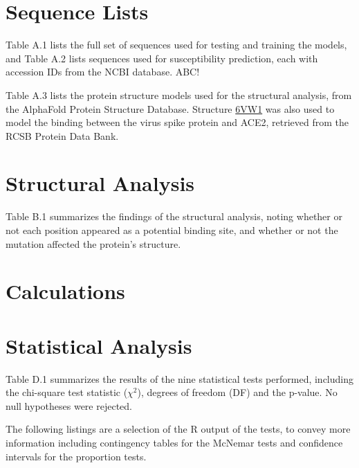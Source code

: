 \newpage
\begin{appendices}

\section{Sequence Lists}


Table A.1 lists the full set of sequences used for testing and training the models, and Table A.2 lists sequences used for susceptibility prediction, each with accession IDs from the NCBI database. 
ABC!



Table A.3 lists the protein structure models used for the structural analysis, from the AlphaFold Protein Structure Database. Structure \href{https://www.rcsb.org/structure/6VW1}{6VW1} was also used to model the binding between the virus spike protein and ACE2, retrieved from the RCSB Protein Data Bank.



\newpage
\section{Structural Analysis}
Table B.1 summarizes the findings of the structural analysis, noting whether or not each position appeared as a potential binding site, and whether or not the mutation affected the protein's structure.


\newpage
\section{Calculations}


\newpage
\section{Statistical Analysis}

Table D.1 summarizes the results of the nine statistical tests performed, including the chi-square test statistic ($\chi^2$), degrees of freedom (DF) and the p-value. No null hypotheses were rejected.



The following listings are a selection of the R output of the tests, to convey more information including contingency tables for the McNemar tests and confidence intervals for the proportion tests.



\end{appendices}

